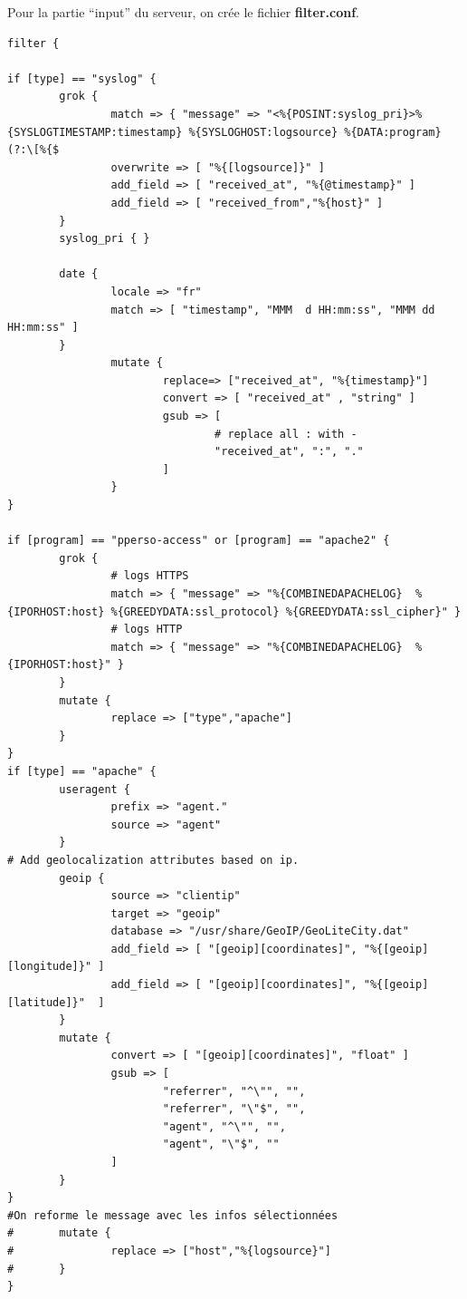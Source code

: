 \documentclass[11pt,a4paper]{article}
\begin{document}
Pour la partie “input” du serveur, on crée le fichier \textbf{filter.conf}.

\begin{verbatim}
filter {

if [type] == "syslog" {
        grok {
                match => { "message" => "<%{POSINT:syslog_pri}>%{SYSLOGTIMESTAMP:timestamp} %{SYSLOGHOST:logsource} %{DATA:program}(?:\[%{$
                overwrite => [ "%{[logsource]}" ]
                add_field => [ "received_at", "%{@timestamp}" ]
                add_field => [ "received_from","%{host}" ]
        }
        syslog_pri { }
        
        date {
                locale => "fr"
                match => [ "timestamp", "MMM  d HH:mm:ss", "MMM dd HH:mm:ss" ]
        }
                mutate {
                        replace=> ["received_at", "%{timestamp}"]
                        convert => [ "received_at" , "string" ]
                        gsub => [
                                # replace all : with -
                                "received_at", ":", "."
                        ]
                }
}

if [program] == "pperso-access" or [program] == "apache2" {
        grok {
                # logs HTTPS
                match => { "message" => "%{COMBINEDAPACHELOG}  %{IPORHOST:host} %{GREEDYDATA:ssl_protocol} %{GREEDYDATA:ssl_cipher}" }
                # logs HTTP
                match => { "message" => "%{COMBINEDAPACHELOG}  %{IPORHOST:host}" }
        }
        mutate {
                replace => ["type","apache"]
        }
}
if [type] == "apache" {
        useragent {
                prefix => "agent."
                source => "agent"
        }
# Add geolocalization attributes based on ip.
        geoip {
                source => "clientip"
                target => "geoip"
                database => "/usr/share/GeoIP/GeoLiteCity.dat"
                add_field => [ "[geoip][coordinates]", "%{[geoip][longitude]}" ]
                add_field => [ "[geoip][coordinates]", "%{[geoip][latitude]}"  ]
        }
        mutate {
                convert => [ "[geoip][coordinates]", "float" ]
                gsub => [
                        "referrer", "^\"", "",
                        "referrer", "\"$", "",
                        "agent", "^\"", "",
                        "agent", "\"$", ""
                ]
        }
}
#On reforme le message avec les infos sélectionnées
#       mutate {
#               replace => ["host","%{logsource}"]
#       }
}
\end{verbatim}
\end{document}
